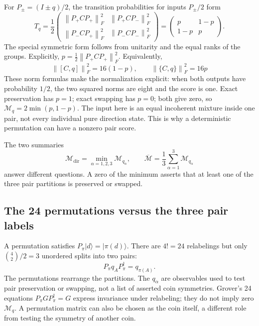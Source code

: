 \documentclass[11pt,a4paper,oneside]{report}
\newcommand{\ket}[1]{\lvert #1\rangle}
\newcommand{\Id}{I}
\newcommand{\norm}[1]{\left\lVert#1\right\rVert}
\numberwithin{equation}{chapter}
\begin{document}
For \(P_\pm=(\Id\pm q)/2\), the transition probabilities for
inputs \(P_\pm/2\) form
\begin{equation}
T_q=\frac12
\begin{pmatrix}
\norm{P_+CP_+}_F^2&\norm{P_+CP_-}_F^2\\
\norm{P_-CP_+}_F^2&\norm{P_-CP_-}_F^2
\end{pmatrix}
=\begin{pmatrix}p&1-p\\1-p&p\end{pmatrix}.
\end{equation}
The special symmetric form follows from unitarity and the equal ranks
of the groups. Explicitly, \(p=\tfrac12\norm{P_+CP_+}_F^2\). Equivalently,
\begin{equation}
\norm{[C,q]}_F^2=16(1-p),\qquad
\norm{\{C,q\}}_F^2=16p
\end{equation}
These norm formulas make the normalization explicit: when both outputs have probability
\(1/2\), the two squared norms are eight and the score is one.
Exact preservation has \(p=1\); exact swapping has \(p=0\); both
give zero, so \(\mathcal M_q=2\min(p,1-p)\).
The input here is an equal incoherent mixture inside one
pair, not every individual pure direction state. This is why a
deterministic permutation can have a nonzero pair score.

The two summaries
\begin{equation}
\mathcal M_{\mathrm{dir}}=\min_{\alpha=1,2,3}\mathcal M_{q_\alpha},
\qquad
\overline{\mathcal M}=\frac13\sum_{\alpha=1}^3\mathcal M_{q_\alpha}
\end{equation}
answer different questions. A zero of the minimum asserts that at
least one of the three pair partitions is preserved or swapped.

\subsection{The 24 permutations versus the three pair labels}

A permutation satisfies \(P_\pi\ket d=\ket{\pi(d)}\).
There are \(4!=24\) relabelings but only \(\binom42/2=3\)
unordered splits into two pairs:
\[
P_\pi q_A P_\pi^\dagger=q_{\pi(A)}.
\]
The permutations rearrange the partitions. The \(q_\alpha\) are
observables used to test pair preservation or swapping, not a list
of asserted coin symmetries. Grover's 24 equations
\(P_\pi G P_\pi^\dagger=G\) express invariance under relabeling;
they do not imply zero \(\mathcal M_q\).
A permutation matrix can also be chosen as the coin itself, a different
role from testing the symmetry of another coin.
\end{document}
